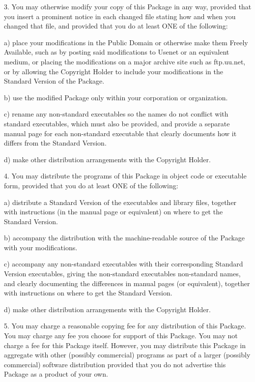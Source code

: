\documentclass{doc}
\begin{document}
3. You may otherwise modify your copy of this Package in any way, provided that you insert
a prominent notice in each changed file stating how and when you changed that file, and
provided that you do at least ONE of the following:


a) place your modifications in the Public Domain or otherwise make them Freely Available,
such as by posting said modifications to Usenet or an equivalent medium, or placing the
modifications on a major archive site such as ftp.uu.net, or by allowing the Copyright
Holder to include your modifications in the Standard Version of the Package.

b) use the modified Package only within your corporation or organization.

c) rename any non-standard executables so the names do not conflict with standard
executables, which must also be provided, and provide a separate manual page for each
non-standard executable that clearly documents how it differs from the Standard Version.

d) make other distribution arrangements with the Copyright Holder.


4. You may distribute the programs of this Package in object code or executable form,
provided that you do at least ONE of the following:


a) distribute a Standard Version of the executables and library files, together with
instructions (in the manual page or equivalent) on where to get the Standard Version.

b) accompany the distribution with the machine-readable source of the Package with your
modifications.

c) accompany any non-standard executables with their corresponding Standard Version
executables, giving the non-standard executables non-standard names, and clearly
documenting the differences in manual pages (or equivalent), together with instructions on
where to get the Standard Version.

d) make other distribution arrangements with the Copyright Holder.


5. You may charge a reasonable copying fee for any distribution of this Package. You may
charge any fee you choose for support of this Package. You may not charge a fee for this
Package itself. However, you may distribute this Package in aggregate with other (possibly
commercial) programs as part of a larger (possibly commercial) software distribution
provided that you do not advertise this Package as a product of your own.
\end{document}
